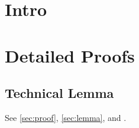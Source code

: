\documentclass[twocolumn,unicode]{wrapper}
\begin{document}
\wrapperclass\articleclass\layoutmode\hypermode
\tableofcontents
\section{Intro}
\appendices
\section{Detailed Proofs}\label{sec:proof}
\subsection{Technical Lemma}\label{sec:lemma}
See \autoref{sec:proof}, \autoref{sec:lemma}, and .
\end{document}
